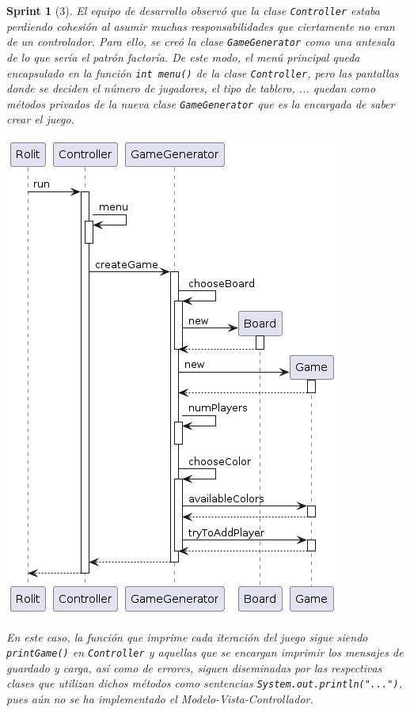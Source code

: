 \documentclass{article}
\theoremstyle{break}
\newtheorem*{sprint}{Sprint}
\begin{document}
\begin{sprint}[3]
El equipo de desarrollo observó que la clase \texttt{Controller} estaba perdiendo cohesión al asumir muchas responsabilidades que ciertamente no eran de un controlador. Para ello, se creó la clase \texttt{GameGenerator} como una antesala de lo que sería el patrón factoría. De este modo, el menú principal queda encapsulado en la función \texttt{int menu()} de la clase \texttt{Controller}, pero las pantallas donde se deciden el número de jugadores, el tipo de tablero, ... quedan como métodos privados de la nueva clase \texttt{GameGenerator} que es la encargada de saber crear el juego.
\begin{center}
\includegraphics[scale=0.55]{MenuPpal_sprint3_seq}
\end{center}
En este caso, la función que imprime cada iteración del juego sigue siendo \texttt{printGame()} en \texttt{Controller} y aquellas que se encargan imprimir los mensajes de guardado y carga, así como de errores, siguen diseminadas por las respectivas clases que utilizan dichos métodos como sentencias \texttt{System.out.println("...")}, pues aún no se ha implementado el Modelo-Vista-Controllador.
\end{sprint}
\end{document}
